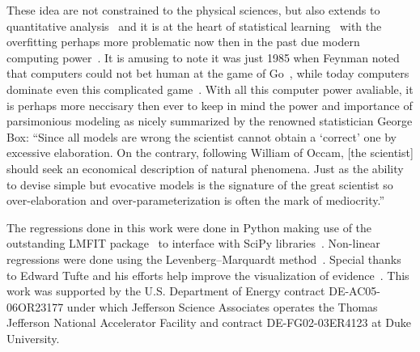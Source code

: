 \documentclass[10pt,aps,prc,twocolumn]{revtex4-1}
\begin{document}
These idea are not constrained to the physical sciences, but also extends 
to quantitative analysis~\cite{Brighton:2015} and it is at the heart of statistical 
learning~\cite{Hastie:2009} with the overfitting perhaps more problematic now then
in the past due modern computing power~\cite{Cawley:2010}.   It is amusing to note it
was just 1985 when Feynman noted that computers could not bet human at the
game of Go~\cite{Feynman:2008}, while today computers dominate even this complicated game~\cite{Silver:2016,Barradas:2018}.
With all this computer power avaliable, it is perhaps more neccisary then ever
to keep in mind the power and importance of parsimonious modeling as nicely 
summarized by the renowned statistician George Box: 
``Since all models are wrong the scientist cannot obtain a `correct' one
by excessive elaboration.  On the contrary, following William of Occam, 
[the scientist] should seek an economical description of natural phenomena. 
Just as the ability to devise simple but evocative models is the signature of the
great scientist so over-elaboration and over-parameterization is often
the mark of mediocrity.''~\cite{Box76}


\begin{acknowledgments}
The regressions done in this work were done in Python making use of the
outstanding LMFIT package~\cite{Newville:2014} to interface with SciPy
libraries~\cite{Jones:2001}.  Non-linear regressions were done using the
Levenberg–Marquardt method~\cite{Levenberg:1944,Marquardt:1963}.  Special
thanks to Edward Tufte and his efforts help improve the visualization of 
evidence~\cite{Tufte:1986,Tufte:1990,Tufte:1997,Tufte:2006}.
This work was supported by the U.S.  Department of Energy contract DE-AC05-06OR23177
under which Jefferson Science Associates operates the Thomas Jefferson National 
Accelerator Facility and contract DE-FG02-03ER4123 at Duke University.
\end{acknowledgments}
\end{document}
